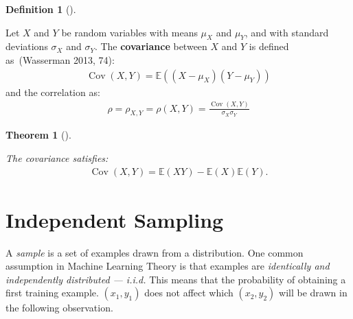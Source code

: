 \documentclass[
  letterpaper,
  12pt,
  british]{tufte-book}
\theoremstyle{plain}
\newtheorem{theorem}{Theorem}[chapter]
\theoremstyle{plain}
\theoremstyle{definition}
\newtheorem{definition}{Definition}[chapter]
\theoremstyle{remark}
\begin{document}
\leavevmode{}%
\begin{definition}[]\label{def-covariance}

Let \({\mathit{X}}\) and \({\mathit{Y}}\) be random variables with means
\(\mu_{\mathit{X}}\) and \(\mu_{\mathit{Y}}\), and with standard
deviations \(\sigma_{\mathit{X}}\) and \(\sigma_{\mathit{Y}}\). The
\textbf{covariance} between \({\mathit{X}}\) and \({\mathit{Y}}\) is
defined as~(Wasserman 2013,
74):
\begin{align}
\operatorname{Cov}({\mathit{X}},{\mathit{Y}}) = \mathbb{E}(({\mathit{X}} - \mu_{\mathit{X}})({\mathit{Y}} - \mu_{\mathit{Y}}))
\end{align} and the correlation as: \begin{align}
\rho = \rho_{{\mathit{X}},{\mathit{Y}}} = \rho({\mathit{X}},{\mathit{Y}}) = \frac{\operatorname{Cov}({\mathit{X}},{\mathit{Y}})}{\sigma_{\mathit{X}} \sigma_{\mathit{Y}}}
\end{align}

\end{definition}

\leavevmode{}%
\begin{theorem}[]\label{thm-covariance}

The covariance satisfies: \begin{align}
\operatorname{Cov}({\mathit{X}},{\mathit{Y}})=\mathbb{E}({\mathit{X}}{\mathit{Y}})- \mathbb{E}({\mathit{X}}) \mathbb{E}({\mathit{Y}}).
\end{align}

\end{theorem}

\hypertarget{independent-sampling}{%
\section{Independent Sampling}\label{independent-sampling}}

A \emph{sample} is a set of examples drawn from a
distribution. One common assumption in Machine Learning Theory is that
examples are \emph{identically and independently distributed --- i.i.d.}
This means that the probability of obtaining a first training example.
\((\mathit{x}_1, \mathit{y}_1)\) does not affect which
\((\mathit{x}_2, \mathit{y}_2)\) will be drawn in the following
observation.
\end{document}
